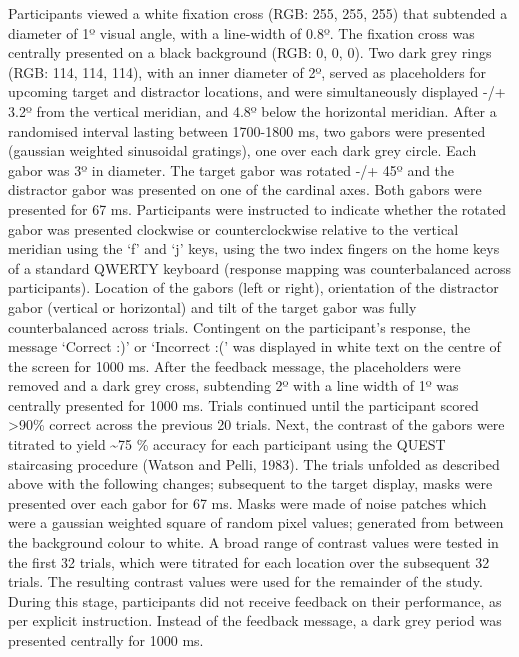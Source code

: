 \documentclass[11pt,halfline,a4paper,]{ouparticle}
\begin{document}
Participants viewed a white fixation cross (RGB: 255, 255, 255) that subtended a diameter of 1º visual angle, with a line-width of 0.8º. The fixation cross was centrally presented on a black background (RGB: 0, 0, 0). Two dark grey rings (RGB: 114, 114, 114), with an inner diameter of 2º, served as placeholders for upcoming target and distractor locations, and were simultaneously displayed -/+ 3.2º from the vertical meridian, and 4.8º below the horizontal meridian. After a randomised interval lasting between 1700-1800 ms, two gabors were presented (gaussian weighted sinusoidal gratings), one over each dark grey circle. Each gabor was 3º in diameter. The target gabor was rotated -/+ 45º and the distractor gabor was presented on one of the cardinal axes. Both gabors were presented for 67 ms. Participants were instructed to indicate whether the rotated gabor was presented clockwise or counterclockwise relative to the vertical meridian using the `f' and `j' keys, using the two index fingers on the home keys of a standard QWERTY keyboard (response mapping was counterbalanced across participants). Location of the gabors (left or right), orientation of the distractor gabor (vertical or horizontal) and tilt of the target gabor was fully counterbalanced across trials. Contingent on the participant's response, the message `Correct :)' or `Incorrect :(' was displayed in white text on the centre of the screen for 1000 ms. After the feedback message, the placeholders were removed and a dark grey cross, subtending 2º with a line width of 1º was centrally presented for 1000 ms. Trials continued until the participant scored \textgreater90\% correct across the previous 20 trials. Next, the contrast of the gabors were titrated to yield \textasciitilde75 \% accuracy for each participant using the QUEST staircasing procedure (Watson and Pelli, 1983). The trials unfolded as described above with the following changes; subsequent to the target display, masks were presented over each gabor for 67 ms. Masks were made of noise patches which were a gaussian weighted square of random pixel values; generated from between the background colour to white. A broad range of contrast values were tested in the first 32 trials, which were titrated for each location over the subsequent 32 trials. The resulting contrast values were used for the remainder of the study. During this stage, participants did not receive feedback on their performance, as per explicit instruction. Instead of the feedback message, a dark grey period was presented centrally for 1000 ms.
\end{document}
